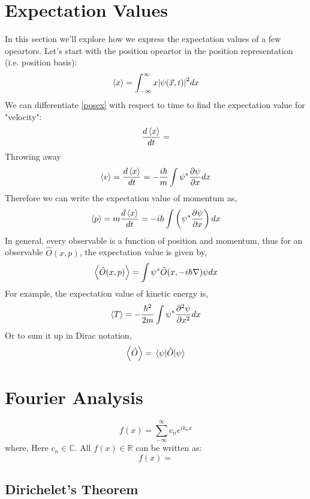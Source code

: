 \section{Expectation Values}
In this section we'll explore how we express the expectation values of a few opeartors. Let's start with the position opeartor in the position representation (i.e. position basis):
\begin{equation} \label{posex}
	\expval{x} = \int_{- \infty}^{\infty} x \abs{\psi(\vec{x}, t)}^{2} dx
\end{equation}
We can differentiate \ref{posex} with respect to time to find the expectation value for "velocity":
$$\frac{d \expval{x}}{dt} = $$
Throwing away 
\begin{equation}
	\expval{v} = \frac{d \expval{x}}{dt} = -\frac{i \hbar}{m} \int \psi^{*} \frac{\partial \psi}{\partial x} dx
\end{equation}
Therefore we can write the expectation value of momentum as,
\begin{equation}
	\expval{p} = m \frac{d \expval{x}}{dt} =  -i \hbar \int \left(\psi^{*} \frac{\partial \psi}{\partial x} \right) dx
\end{equation}
In general, every observable is a function of position and momentum, thus for an observable $\hat{O}(x,p)$, the expectation value is given by,
\begin{equation}
	\expval{\hat{O}(x,p)} = \int \psi^{*} \hat{O}(x,-i \hbar \nabla) \psi dx
\end{equation}
For example, the expectation value of kinetic energy is,
\begin{equation}
\expval{T} = -\frac{\hbar^{2}}{2m} \int \psi^{*} \frac{\partial^{2} \psi}{\partial x^{2}} dx
\end{equation}
Or to sum it up in Dirac notation,
\begin{equation}
	\expval{\hat{O}} = \expval{\hat{O}}{\psi}
\end{equation}
\section{Fourier Analysis}
\begin{equation}
f(x) = \sum_{-\infty}^{\infty} c_{n}e^{i k_{n}x}
\end{equation}
where,
Here $c_{n} \in \mathbb{C}$. All $f(x) \in \mathbb{R}$ can be written as:
\begin{equation}
f(x) = 
\end{equation}
\subsection{Dirichelet's Theorem}

